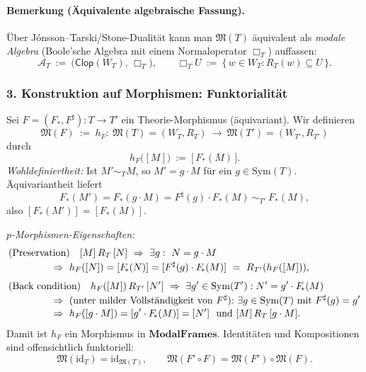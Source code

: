 \documentclass[10pt, letterpaper]{article}
\begin{document}
\paragraph{Bemerkung (Äquivalente algebraische Fassung).}
Über Jónsson–Tarski/Stone-Dualität kann man $\mathfrak{M}(T)$ äquivalent als 
\emph{modale Algebra} (Boole’sche Algebra mit einem Normaloperator $\Box_T$) auffassen:
\[
\mathcal{A}_T\ :=\ \bigl(\mathsf{Clop}(W_T),\,\Box_T\bigr),\qquad
\Box_T U\ :=\ \{\,w\in W_T: R_T(w)\subseteq U\,\}.
\]

\subsubsection*{3. Konstruktion auf Morphismen: Funktorialität}

Sei $F=(F_{\!*},F^\sharp):T\to T'$ ein Theorie-Morphismus (äquivariant).
Wir definieren
\[
\mathfrak{M}(F)\ :=\ h_F:\ \mathfrak{M}(T)=(W_T,R_T)\ \longrightarrow\ \mathfrak{M}(T')=(W_{T'},R_{T'})
\]
durch
\[
h_F\big([M]\big)\ :=\ \big[\,F_{\!*}(M)\,\big].
\]
\emph{Wohldefiniertheit:} Ist $M'\sim_T M$, so $M'=g\cdot M$ für ein $g\in\mathrm{Sym}(T)$.
Äquivariantheit liefert
\[
F_{\!*}(M')=F_{\!*}(g\cdot M)=F^\sharp(g)\cdot F_{\!*}(M)\ \sim_{T'}\ F_{\!*}(M),
\]
also $[F_{\!*}(M')]=[F_{\!*}(M)]$. 

\emph{$p$-Morphismen-Eigenschaften:} 
\begin{align*}
&\text{(Preservation)}\quad [M]\,R_T\,[N]\ \Rightarrow\ \exists g:\ N=g\cdot M 
\\[-2pt]
&\hspace{1.5cm}\Rightarrow\ h_F([N])=[F_{\!*}(N)]=[F^\sharp(g)\cdot F_{\!*}(M)]\ =\ R_{T'}(h_F([M])),\\[4pt]
&\text{(Back condition)}\quad 
h_F([M])\,R_{T'}\,[N']\ \Rightarrow\ \exists g'\in\mathrm{Sym}(T'): N'=g'\cdot F_{\!*}(M)\\[-2pt]
&\hspace{1.5cm}\Rightarrow\ \text{(unter milder Vollständigkeit von $F^\sharp$):}\ 
\exists g\in\mathrm{Sym}(T)\ \text{mit }F^\sharp(g)=g'
\\[-2pt]
&\hspace{1.5cm}\Rightarrow\ h_F([g\cdot M])=[g'\cdot F_{\!*}(M)]=[N']\ \text{ und } [M]\,R_T\,[g\cdot M].
\end{align*}
Damit ist $h_F$ ein Morphismus in $\mathbf{ModalFrames}$. 
Identitäten und Kompositionen sind offensichtlich funktoriell:
\[
\mathfrak{M}(\mathrm{id}_T)=\mathrm{id}_{\mathfrak{M}(T)},\qquad 
\mathfrak{M}(F'\circ F)=\mathfrak{M}(F')\circ\mathfrak{M}(F).
\]
\end{document}
